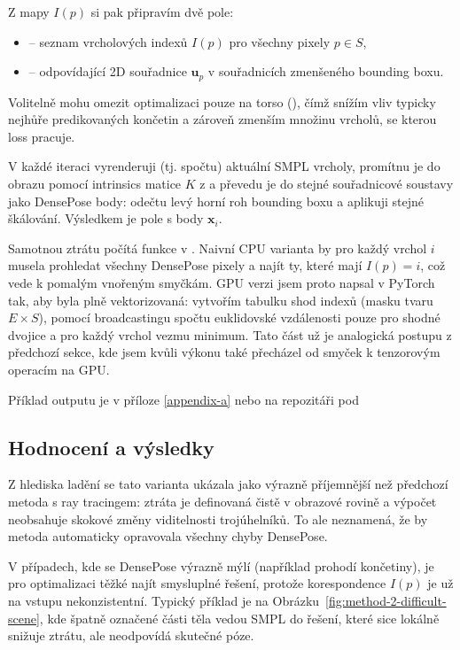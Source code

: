 \documentclass[11pt,a4paper,twoside,openright]{report}
\begin{document}
Z mapy $I(p)$ si pak připravím dvě pole:
\begin{itemize}
    \item \textbf{} -- seznam vrcholových indexů $I(p)$ pro všechny pixely $p \in S$,
    \item \textbf{} -- odpovídající 2D souřadnice $\mathbf{u}_p$ v souřadnicích zmenšeného bounding boxu.
\end{itemize}
Volitelně mohu omezit optimalizaci pouze na torso (), čímž snížím vliv typicky nejhůře predikovaných končetin a zároveň zmenším množinu vrcholů, se kterou loss pracuje.

V každé iteraci vyrenderuji (tj. spočtu) aktuální SMPL vrcholy, promítnu je do obrazu pomocí intrinsics matice $K$ z  a převedu je do stejné souřadnicové soustavy jako DensePose body: odečtu levý horní roh bounding boxu a aplikuji stejné škálování. Výsledkem je pole  s body $\mathbf{x}_i$.

Samotnou ztrátu počítá funkce  v . Naivní CPU varianta by pro každý vrchol $i$ musela prohledat všechny DensePose pixely a najít ty, které mají $I(p)=i$, což vede k pomalým vnořeným smyčkám. GPU verzi jsem proto napsal v PyTorch tak, aby byla plně vektorizovaná: vytvořím tabulku shod indexů (masku tvaru $E \times S$), pomocí broadcastingu spočtu euklidovské vzdálenosti pouze pro shodné dvojice a pro každý vrchol vezmu minimum. Tato část už je analogická postupu z předchozí sekce, kde jsem kvůli výkonu také přecházel od smyček k tenzorovým operacím na GPU.

Příklad outputu je v příloze \ref{appendix-a} nebo na repozitáři pod 

\subsection{Hodnocení a výsledky}

Z hlediska ladění se tato varianta ukázala jako výrazně příjemnější než předchozí metoda s ray tracingem: ztráta je definovaná čistě v obrazové rovině a výpočet neobsahuje skokové změny viditelnosti trojúhelníků. To ale neznamená, že by metoda automaticky opravovala všechny chyby DensePose.

V případech, kde se DensePose výrazně mýlí (například prohodí končetiny), je pro optimalizaci těžké najít smysluplné řešení, protože korespondence $I(p)$ je už na vstupu nekonzistentní. Typický příklad je na Obrázku~\ref{fig:method-2-difficult-scene}, kde špatně označené části těla vedou SMPL do řešení, které sice lokálně snižuje ztrátu, ale neodpovídá skutečné póze.
\end{document}
